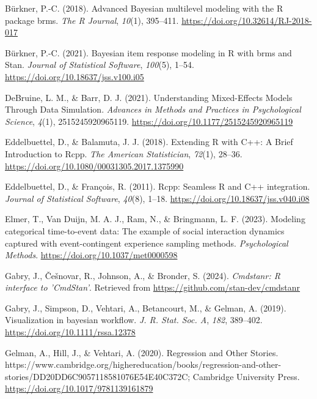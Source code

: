 \documentclass[
  man, donotrepeattitle,floatsintext]{apa6}
\newlength{\cslhangindent}
\newenvironment{CSLReferences}[2] %
 {\begin{list}{}{%
  \setlength{\itemindent}{0pt}
  \setlength{\leftmargin}{0pt}
  \setlength{\parsep}{0pt}
  \ifodd #1
   \setlength{\leftmargin}{\cslhangindent}
   \setlength{\itemindent}{-1\cslhangindent}
  \fi
  \setlength{\itemsep}{#2\baselineskip}}}
 {\end{list}}
\begin{document}
\begin{CSLReferences}{1}{0}
Bürkner, P.-C. (2018). Advanced {Bayesian} multilevel modeling with the {R} package {brms}. \emph{The R Journal}, \emph{10}(1), 395--411. \url{https://doi.org/10.32614/RJ-2018-017}

Bürkner, P.-C. (2021). Bayesian item response modeling in {R} with {brms} and {Stan}. \emph{Journal of Statistical Software}, \emph{100}(5), 1--54. \url{https://doi.org/10.18637/jss.v100.i05}

DeBruine, L. M., \& Barr, D. J. (2021). Understanding {Mixed-Effects Models Through Data Simulation}. \emph{Advances in Methods and Practices in Psychological Science}, \emph{4}(1), 2515245920965119. \url{https://doi.org/10.1177/2515245920965119}

Eddelbuettel, D., \& Balamuta, J. J. (2018). {Extending {R} with {C++}: A Brief Introduction to {Rcpp}}. \emph{The American Statistician}, \emph{72}(1), 28--36. \url{https://doi.org/10.1080/00031305.2017.1375990}

Eddelbuettel, D., \& François, R. (2011). {Rcpp}: Seamless {R} and {C++} integration. \emph{Journal of Statistical Software}, \emph{40}(8), 1--18. \url{https://doi.org/10.18637/jss.v040.i08}

Elmer, T., Van Duijn, M. A. J., Ram, N., \& Bringmann, L. F. (2023). Modeling categorical time-to-event data: {The} example of social interaction dynamics captured with event-contingent experience sampling methods. \emph{Psychological Methods}. \url{https://doi.org/10.1037/met0000598}

Gabry, J., Češnovar, R., Johnson, A., \& Bronder, S. (2024). \emph{Cmdstanr: R interface to 'CmdStan'}. Retrieved from \url{https://github.com/stan-dev/cmdstanr}

Gabry, J., Simpson, D., Vehtari, A., Betancourt, M., \& Gelman, A. (2019). Visualization in bayesian workflow. \emph{J. R. Stat. Soc. A}, \emph{182}, 389--402. \url{https://doi.org/10.1111/rssa.12378}

Gelman, A., Hill, J., \& Vehtari, A. (2020). Regression and {Other Stories}. https://www.cambridge.org/highereducation/books/regression-and-other-stories/DD20DD6C9057118581076E54E40C372C; Cambridge University Press. \url{https://doi.org/10.1017/9781139161879}


\end{CSLReferences}
\end{document}
